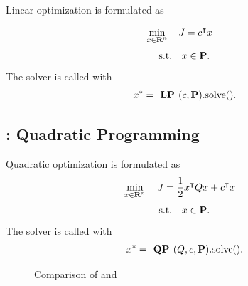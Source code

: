 \documentclass{article}
\begin{document}
    Linear optimization is formulated as \cite[p.~146]{bv_cvxbook} 

    \begin{align}
        \min_{x\in\textbf{R}^n}\quad
        J
        &=
                c^\intercal x
    \end{align}
    \begin{align*}
        \text{s.t.}\quad x\in\textbf{P}.
    \end{align*}
    The solver is called with
    \begin{align*}
        x^* = \textbf{ LP }(c,\textbf{P}).\text{solve()}. 
    \end{align*}

\subsection{\QP: Quadratic Programming}

    Quadratic optimization is formulated as \cite[p.~152]{bv_cvxbook}  
    \begin{align}
        \min_{x\in\textbf{R}^n}\quad
        J
        &=
                \frac{1}{2} x^\intercal Q x
            +
                c^\intercal x
    \end{align}
    \begin{align*}
        \text{s.t.}\quad x\in\textbf{P}.
    \end{align*}
    The solver is called with    
    \begin{align*}
        x^* = \textbf{ QP }(Q,c,\textbf{P}).\text{solve()}.
    \end{align*}

    \begin{figure}[b]
        \centering
        \qquad
        \caption{Comparison of \LP and \QP}%
        \label{fig:LPvsQP}%
    \end{figure}
\end{document}
